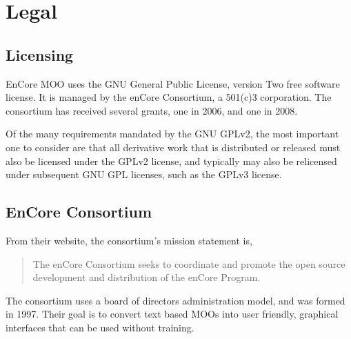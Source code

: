 \documentclass[12pt, letterpaper]{report}
\begin{document}
\chapter{Legal}
\section{Licensing}
\par
EnCore MOO uses the GNU General Public License, version Two free software license. It is managed by the enCore Consortium, a 501(c)3 corporation. The consortium has received several grants, one in 2006, and one in 2008.

\par
Of the many requirements mandated by the GNU GPLv2, the most important one to consider are that all derivative work that is distributed or released must also be licensed under the GPLv2 license, and typically may also be relicensed under subsequent GNU GPL licenses, such as the GPLv3 license.\cite{GPLv2}

\section{EnCore Consortium}
\par

\par 
From their website, the consortium's mission statement is,

\begin{quotation}
The enCore Consortium seeks to coordinate and promote the open source development and distribution of the enCore Program.
\end{quotation}

\par
The consortium uses a board of directors administration model, and was formed in 1997. Their goal is to convert text based MOOs into user friendly, graphical interfaces that can be used without training.
\end{document}
